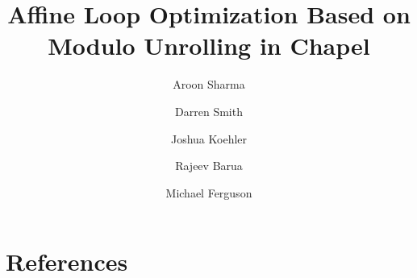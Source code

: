 \documentclass[review]{elsarticle}
\begin{document}
\begin{frontmatter}

\title{Affine Loop Optimization Based on Modulo Unrolling in Chapel}

\author[umd]{Aroon Sharma}
\author[umd]{Darren Smith}
\author[umd]{Joshua Koehler}
\author[umd]{Rajeev Barua}
\author[lts]{Michael Ferguson}
\address[umd]{Universtiy of Maryland Department of Electrical and Computer Engineering, College Park, MD}
\address[lts]{Laboratory for Telecommunication Sciences, College Park, MD}






\end{frontmatter}











\section{References}

\end{document}
